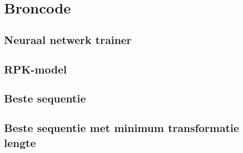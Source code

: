 \chapter{Broncode}
\label{app:broncode}

\section{Neuraal netwerk trainer}
\label{Broncode:ANN}


\section{RPK-model}
\label{Broncode:RPK}


\section{Beste sequentie}
\label{Broncode:algo1}


\section{Beste sequentie met minimum transformatie lengte}
\label{Broncode:algo2}


